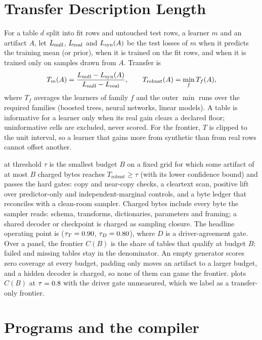 \documentclass{article}
\theoremstyle{remark}
\newcommand{\Tr}{T_{\mathrm{robust}}}
\begin{document}
\section{Transfer Description Length}
\label{sec:metric}

For a table $d$ split into fit rows and untouched test rows, a learner $m$ and an artifact $A$, let
$L_{\mathrm{null}}$, $L_{\mathrm{real}}$ and $L_{\mathrm{syn}}(A)$ be the test losses of $m$ when it predicts the training mean (or prior),
when it is trained on the fit rows, and when it is trained only on samples drawn from $A$. Transfer is
\begin{equation}
  T_{m}(A) = \frac{\Lnull - \Lsyn(A)}{\Lnull - \Lreal},
  \qquad \Tr(A) = \min_{f} T_f(A),
  \label{eq:transfer}
\end{equation}
where $T_f$ averages the learners of family $f$ and the outer $\min$ runs over the required families (boosted
trees, neural networks, linear models). A table is informative for a learner only when its real gain
clears a declared floor; uninformative cells are excluded, never scored. For the frontier, $T$ is clipped
to the unit interval, so a learner that gains more from synthetic than from real rows cannot offset
another.

\MetricName{} at threshold $\tau$ is the smallest budget $B$ on a fixed grid for which some artifact of
at most $B$ charged bytes reaches $\Tr \geq \tau$ (with its lower confidence bound) and passes the hard
gates: copy and near-copy checks, a cleartext scan, positive lift over predictor-only and
independent-marginal controls, and a byte ledger that reconciles with a clean-room sampler. Charged
bytes include every byte the sampler reads: schema, transforms, dictionaries, parameters and framing; a
shared decoder or checkpoint is charged as sampling closure. The headline operating point is
\HeadlinePoint{} ($\tau_T = 0.90$, $\tau_D = 0.80$), where $D$ is a driver-agreement gate. Over a
panel, the frontier $C(B)$ is the share of tables that qualify at budget $B$; failed and missing tables
stay in the denominator. An empty generator scores zero coverage at every budget, padding only moves an
artifact to a larger budget, and a hidden decoder is charged, so none of them can game the frontier.
 plots $C(B)$ at $\tau = 0.8$ with the driver gate unmeasured, which we label as
a transfer-only frontier.

\section{Programs and the compiler}
\label{sec:method}
\end{document}
